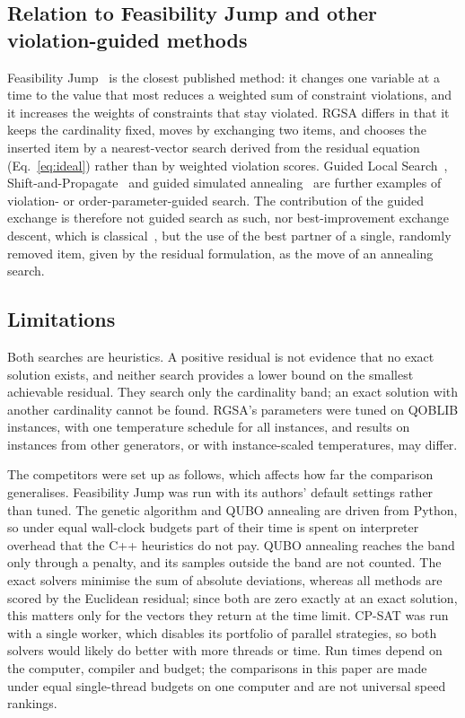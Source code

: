\documentclass[pdflatex,sn-mathphys-num]{sn-jnl}
\theoremstyle{thmstyleone}
\theoremstyle{thmstylethree}
\begin{document}
\subsection{Relation to Feasibility Jump and other violation-guided methods}
Feasibility Jump~\cite{fj2023} is the closest published method: it changes one variable at a time to the value that most reduces a weighted sum of constraint violations, and it increases the weights of constraints that stay violated. RGSA differs in that it keeps the cardinality fixed, moves by exchanging two items, and chooses the inserted item by a nearest-vector search derived from the residual equation (Eq.~\eqref{eq:ideal}) rather than by weighted violation scores. Guided Local Search~\cite{gls1999}, Shift-and-Propagate~\cite{berthold2015} and guided simulated annealing~\cite{chou2003} are further examples of violation- or order-parameter-guided search. The contribution of the guided exchange is therefore not guided search as such, nor best-improvement exchange descent, which is classical~\cite{johnson1991}, but the use of the best partner of a single, randomly removed item, given by the residual formulation, as the move of an annealing search.

\subsection{Limitations}
Both searches are heuristics. A positive residual is not evidence that no exact solution exists, and neither search provides a lower bound on the smallest achievable residual. They search only the cardinality band; an exact solution with another cardinality cannot be found. RGSA's parameters were tuned on QOBLIB instances, with one temperature schedule for all instances, and results on instances from other generators, or with instance-scaled temperatures, may differ.

The competitors were set up as follows, which affects how far the comparison generalises. Feasibility Jump was run with its authors' default settings rather than tuned. The genetic algorithm and QUBO annealing are driven from Python, so under equal wall-clock budgets part of their time is spent on interpreter overhead that the C++ heuristics do not pay. QUBO annealing reaches the band only through a penalty, and its samples outside the band are not counted. The exact solvers minimise the sum of absolute deviations, whereas all methods are scored by the Euclidean residual; since both are zero exactly at an exact solution, this matters only for the vectors they return at the time limit. CP-SAT was run with a single worker, which disables its portfolio of parallel strategies, so both solvers would likely do better with more threads or time. Run times depend on the computer, compiler and budget; the comparisons in this paper are made under equal single-thread budgets on one computer and are not universal speed rankings.
\end{document}
